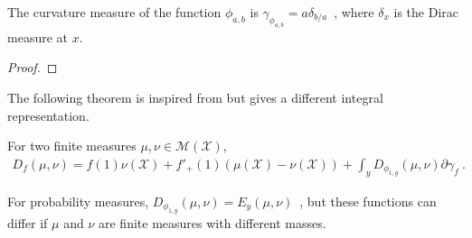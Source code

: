 \begin{lemma}
  \label{lem:curvatureMeasure_statInfoFun}
  The curvature measure of the function $\phi_{a,b}$ is $\gamma_{\phi_{a,b}} = a\delta_{b/a}$~, where $\delta_x$ is the Dirac measure at $x$.
\end{lemma}

\begin{proof}%
\uses{}

\end{proof}

The following theorem is inspired from \cite{liese2006divergences,liese2012phi} but gives a different integral representation.

\begin{theorem}
  \label{thm:fDiv_eq_integral_eGamma}
  \leanok
  For two finite measures $\mu, \nu \in \mathcal M(\mathcal X)$,
  \begin{align*}
  D_f(\mu, \nu) = f(1) \nu(\mathcal X) + f'_+(1)(\mu(\mathcal X) - \nu(\mathcal X)) + \int_y D_{\phi_{1,y}}(\mu, \nu) \partial\gamma_f \: .
  \end{align*}
\end{theorem}

For probability measures, $D_{\phi_{1,y}}(\mu, \nu) = E_y(\mu, \nu)$~, but these functions can differ if $\mu$ and $\nu$ are finite measures with different masses.

